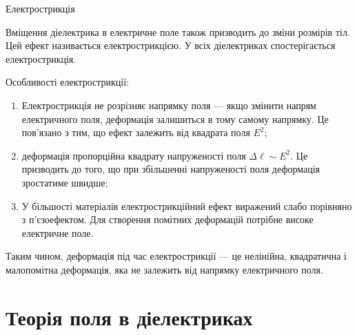 \documentclass[onlytextwidth]{beamer}
\begin{document}
\begin{frame}{Електрострикція}{}
	\begin{block}{}\justifying
		Вміщення діелектрика в електричне поле також призводить до \alert{зміни розмірів тіл}. Цей
		ефект називається  \alert{електрострикцією}. У всіх діелектриках спостерігається
		електрострикція.
	\end{block}

	\begin{block}{}\justifying
		Особливості електрострикції:
		\begin{enumerate}
			\item Електрострикція не розрізняє напрямку поля --- якщо змінити напрям електричного поля,
			      деформація залишиться в тому самому напрямку. Це пов'язано з тим, що ефект залежить від
			      квадрата
			      поля $E^2$;
			\item деформація  пропорційна квадрату напруженості поля $\Delta \ell \sim E^2$. Це призводить
			      до
			      того, що при збільшенні напруженості поля деформація зростатиме швидше;
			\item У більшості матеріалів електрострикційний ефект виражений слабо порівняно з п'єзоефектом.
			      Для
			      створення помітних деформацій потрібне високе електричне поле.
		\end{enumerate}
		Таким чином, деформація під час електрострикції --- це нелінійна, квадратична і малопомітна
		деформація, яка не залежить від напрямку електричного поля.
	\end{block}

\end{frame}

\section{Теорія поля в діелектриках}
\end{document}
